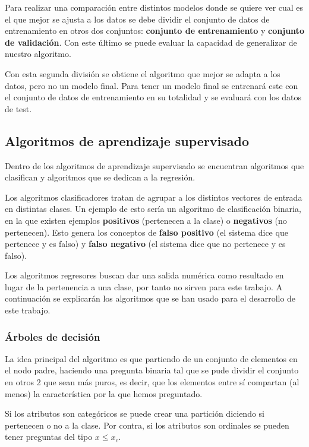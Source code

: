 Para realizar una comparación entre distintos modelos donde se quiere ver cual es el que mejor se ajusta a los datos se debe dividir el conjunto de datos de entrenamiento en otros dos conjuntos: \textbf{conjunto de entrenamiento} y \textbf{conjunto de validación}. Con este último se puede evaluar la capacidad de generalizar de nuestro algoritmo.

Con esta segunda división se obtiene el algoritmo que mejor se adapta a los datos, pero no un modelo final. Para tener un modelo final se entrenará este con el conjunto de datos de entrenamiento en su totalidad y se evaluará con los datos de test.

\subsection{Algoritmos de aprendizaje supervisado} \label{sec:algorithms}

Dentro de los algoritmos de aprendizaje supervisado se encuentran algoritmos que clasifican y algoritmos que se dedican a la regresión.

Los algoritmos clasificadores tratan de agrupar a los distintos vectores de entrada en distintas clases. Un ejemplo de esto sería un algoritmo de clasificación binaria, en la que existen ejemplos \textbf{positivos} (pertenecen a la clase) o \textbf{negativos} (no pertenecen). Esto genera los conceptos de \textbf{falso positivo} (el sistema dice que pertenece y es falso) y \textbf{falso negativo} (el sistema dice que no pertenece y es falso).

Los algoritmos regresores buscan dar una salida numérica como resultado en lugar de la pertenencia a una clase, por tanto no sirven para este trabajo. A continuación se explicarán los algoritmos que se han usado para el desarrollo de este trabajo.

\subsubsection{Árboles de decisión}

La idea principal del algoritmo es que partiendo de un conjunto de elementos en el nodo padre, haciendo una pregunta binaria tal que se pude dividir el conjunto en otros 2 que sean más puros, es decir, que los elementos entre sí compartan (al menos) la característica por la que hemos preguntado.

Si los atributos son categóricos se puede crear una partición diciendo si pertenecen o no a la clase. Por contra, si los atributos son ordinales se pueden tener preguntas del tipo $x \leq x_c$.

